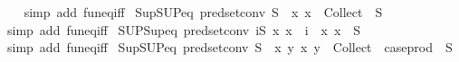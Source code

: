 \begin{isabellebody}
%
\isadelimproof
\ \ %
\endisadelimproof
%
\isatagproof
{}\isamarkupfalse%
\ {\isacharparenleft}{\kern0pt}simp\ add{\isacharcolon}{\kern0pt}\ fun{\isacharunderscore}{\kern0pt}eq{\isacharunderscore}{\kern0pt}iff{\isacharparenright}{\kern0pt}%
\endisatagproof
{\isafoldproof}%
%
\isadelimproof
\isanewline
%
\endisadelimproof
\isanewline
{}\isamarkupfalse%
\ Sup{\isacharunderscore}{\kern0pt}SUP{\isacharunderscore}{\kern0pt}eq\ {\isacharbrackleft}{\kern0pt}pred{\isacharunderscore}{\kern0pt}set{\isacharunderscore}{\kern0pt}conv{\isacharbrackright}{\kern0pt}{\isacharcolon}{\kern0pt}\ {\isachardoublequoteopen}{\isasymSqunion}S\ {\isacharequal}{\kern0pt}\ {\isacharparenleft}{\kern0pt}{\isasymlambda}x{\isachardot}{\kern0pt}\ x\ {\isasymin}\ {\isasymUnion}{\isacharparenleft}{\kern0pt}Collect\ {\isacharbackquote}{\kern0pt}\ S{\isacharparenright}{\kern0pt}{\isacharparenright}{\kern0pt}{\isachardoublequoteclose}\isanewline
%
\isadelimproof
\ \ %
\endisadelimproof
%
\isatagproof
{}\isamarkupfalse%
\ {\isacharparenleft}{\kern0pt}simp\ add{\isacharcolon}{\kern0pt}\ fun{\isacharunderscore}{\kern0pt}eq{\isacharunderscore}{\kern0pt}iff{\isacharparenright}{\kern0pt}%
\endisatagproof
{\isafoldproof}%
%
\isadelimproof
\isanewline
%
\endisadelimproof
\isanewline
{}\isamarkupfalse%
\ SUP{\isacharunderscore}{\kern0pt}Sup{\isacharunderscore}{\kern0pt}eq\ {\isacharbrackleft}{\kern0pt}pred{\isacharunderscore}{\kern0pt}set{\isacharunderscore}{\kern0pt}conv{\isacharbrackright}{\kern0pt}{\isacharcolon}{\kern0pt}\ {\isachardoublequoteopen}{\isacharparenleft}{\kern0pt}{\isasymSqunion}i{\isasymin}S{\isachardot}{\kern0pt}\ {\isacharparenleft}{\kern0pt}{\isasymlambda}x{\isachardot}{\kern0pt}\ x\ {\isasymin}\ i{\isacharparenright}{\kern0pt}{\isacharparenright}{\kern0pt}\ {\isacharequal}{\kern0pt}\ {\isacharparenleft}{\kern0pt}{\isasymlambda}x{\isachardot}{\kern0pt}\ x\ {\isasymin}\ {\isasymUnion}S{\isacharparenright}{\kern0pt}{\isachardoublequoteclose}\isanewline
%
\isadelimproof
\ \ %
\endisadelimproof
%
\isatagproof
{}\isamarkupfalse%
\ {\isacharparenleft}{\kern0pt}simp\ add{\isacharcolon}{\kern0pt}\ fun{\isacharunderscore}{\kern0pt}eq{\isacharunderscore}{\kern0pt}iff{\isacharparenright}{\kern0pt}%
\endisatagproof
{\isafoldproof}%
%
\isadelimproof
\isanewline
%
\endisadelimproof
\isanewline
{}\isamarkupfalse%
\ Sup{\isacharunderscore}{\kern0pt}SUP{\isacharunderscore}{\kern0pt}eq{}\ {\isacharbrackleft}{\kern0pt}pred{\isacharunderscore}{\kern0pt}set{\isacharunderscore}{\kern0pt}conv{\isacharbrackright}{\kern0pt}{\isacharcolon}{\kern0pt}\ {\isachardoublequoteopen}{\isasymSqunion}S\ {\isacharequal}{\kern0pt}\ {\isacharparenleft}{\kern0pt}{\isasymlambda}x\ y{\isachardot}{\kern0pt}\ {\isacharparenleft}{\kern0pt}x{\isacharcomma}{\kern0pt}\ y{\isacharparenright}{\kern0pt}\ {\isasymin}\ {\isacharparenleft}{\kern0pt}{\isasymUnion}{\isacharparenleft}{\kern0pt}Collect\ {\isacharbackquote}{\kern0pt}\ case{\isacharunderscore}{\kern0pt}prod\ {\isacharbackquote}{\kern0pt}\ S{\isacharparenright}{\kern0pt}{\isacharparenright}{\kern0pt}{\isacharparenright}{\kern0pt}{\isachardoublequoteclose}\isanewline

\end{isabellebody}
